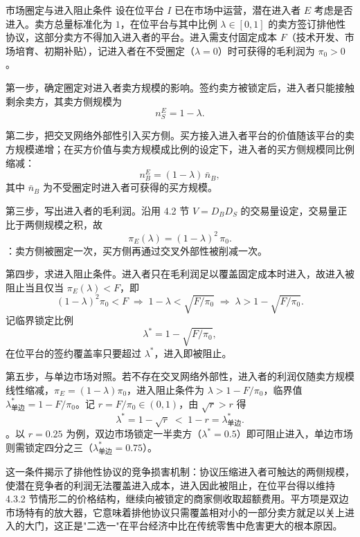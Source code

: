 \begin{derivation}{市场圈定与进入阻止条件}{}
设在位平台 $I$ 已在市场中运营，潜在进入者 $E$ 考虑是否进入。卖方总量标准化为 $1$，在位平台与其中比例 $\lambda \in [0,1]$ 的卖方签订排他性协议，这部分卖方不得加入进入者的平台。进入需支付固定成本 $F$（技术开发、市场培育、初期补贴），记进入者在不受圈定（$\lambda = 0$）时可获得的毛利润为 $\pi_0 > 0$。

第一步，确定圈定对进入者卖方规模的影响。签约卖方被锁定后，进入者只能接触剩余卖方，其卖方侧规模为
\[
n_S^E = 1 - \lambda.
\]

第二步，把交叉网络外部性引入买方侧。买方接入进入者平台的价值随该平台的卖方规模递增；在买方价值与卖方规模成比例的设定下，进入者的买方侧规模同比例缩减：
\[
n_B^E = (1-\lambda)\,\bar n_B,
\]
其中 $\bar n_B$ 为不受圈定时进入者可获得的买方规模。

第三步，写出进入者的毛利润。沿用 4.2 节 $V = D_BD_S$ 的交易量设定，交易量正比于两侧规模之积，故
\[
\pi_E(\lambda) = (1-\lambda)^2\,\pi_0 .
\]
：卖方侧被圈定一次，买方侧再通过交叉外部性被削减一次。

第四步，求进入阻止条件。进入者只在毛利润足以覆盖固定成本时进入，故进入被阻止当且仅当 $\pi_E(\lambda) < F$，即
\[
(1-\lambda)^2\pi_0 < F
\;\Longrightarrow\;
1-\lambda < \sqrt{F/\pi_0}
\;\Longrightarrow\;
\lambda > 1 - \sqrt{F/\pi_0}.
\]
记临界锁定比例
\[
\lambda^* = 1 - \sqrt{F/\pi_0},
\]
在位平台的签约覆盖率只要超过 $\lambda^*$，进入即被阻止。

第五步，与单边市场对照。若不存在交叉网络外部性，进入者的利润仅随卖方规模线性缩减，$\pi_E = (1-\lambda)\pi_0$，进入阻止条件为 $\lambda > 1 - F/\pi_0$，临界值 $\lambda^*_{\text{单边}} = 1 - F/\pi_0$。记 $r = F/\pi_0 \in (0,1)$，由 $\sqrt r > r$ 得
\[
\lambda^* = 1-\sqrt r \;<\; 1-r = \lambda^*_{\text{单边}} .
\]
。以 $r = 0.25$ 为例，双边市场锁定一半卖方（$\lambda^* = 0.5$）即可阻止进入，单边市场则需锁定四分之三（$\lambda^*_{\text{单边}} = 0.75$）。
\end{derivation}

这一条件揭示了排他性协议的竞争损害机制：协议压缩进入者可触达的两侧规模，使潜在竞争者的利润无法覆盖进入成本，进入因此被阻止，在位平台得以维持 4.3.2 节情形二的价格结构，继续向被锁定的商家侧收取超额费用。平方项是双边市场特有的放大器，它意味着排他协议只需覆盖相对小的一部分卖方就足以关上进入的大门，这正是"二选一"在平台经济中比在传统零售中危害更大的根本原因。

